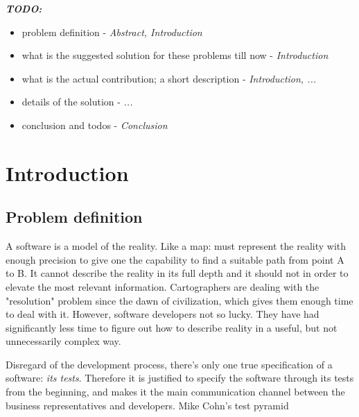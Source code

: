 \documentclass[conference]{IEEEtran}
\begin{document}
%
\IEEEpeerreviewmaketitle

\textbf{\textit{TODO:}}
\begin{itemize}
    \item problem definition - \textit{Abstract, Introduction}
    \item what is the suggested solution for these problems till now - \textit{Introduction}
    \item what is the actual contribution; a short description - \textit{Introduction, ...}
    \item details of the solution - \textit{...}
    \item conclusion and todos - \textit{Conclusion}
\end{itemize}

\section{Introduction}
\subsection{Problem definition}


A software is a model of the reality. Like a map: must represent the reality with enough precision to give one the capability to find a suitable path from point A to B. It cannot describe the reality in its full depth and it should not in order to elevate the most relevant information. Cartographers are dealing with the "resolution" problem since the dawn of civilization, which gives them enough time to deal with it. However, software developers not so lucky. They have had significantly less time to figure out how to describe reality in a useful, but not unnecessarily complex way.

Disregard of the development process, there's only one true specification of a software: \textit{its tests}. Therefore it is justified to specify the software through its tests from the beginning, and makes it the main communication channel between the business representatives and developers. Mike Cohn's test pyramid
\end{document}
